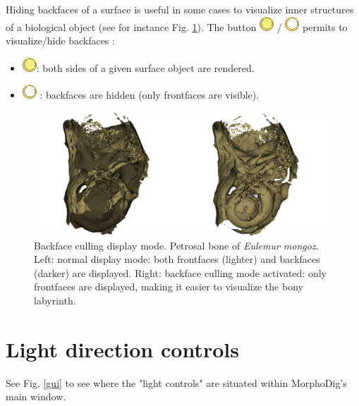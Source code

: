 Hiding backfaces of a surface is useful in some cases to visualize inner structures of a biological object (see for instance Fig. \ref{backface_example}). The button \includegraphics[scale=0.7]{images/06/display/backface_on.png} / \includegraphics[scale=0.7]{images/06/display/backface_off.png}  permits to visualize/hide backfaces :
\begin{itemize}
\item  \includegraphics[scale=0.7]{images/06/display/backface_on.png}: both sides of a given surface object are rendered.
\item	\includegraphics[scale=0.7]{images/06/display/backface_off.png} : backfaces are hidden (only frontfaces are visible).

\end{itemize}


\begin{figure}
  \centering
  \includegraphics[scale=0.3]{images/06/display/backface_example.png} 
	\caption{Backface culling display mode. Petrosal bone of \textit{Eulemur mongoz}. Left: normal display mode: both frontfaces (lighter) and backfaces (darker) are displayed. Right: backface culling mode activated: only frontfaces are displayed, making it easier to visualize the bony labyrinth. }
\label{backface_example}
 
\end{figure}


\section{Light direction controls}
See Fig. \ref{gui} to see where the "light controls" are situated within MorphoDig's main window.


